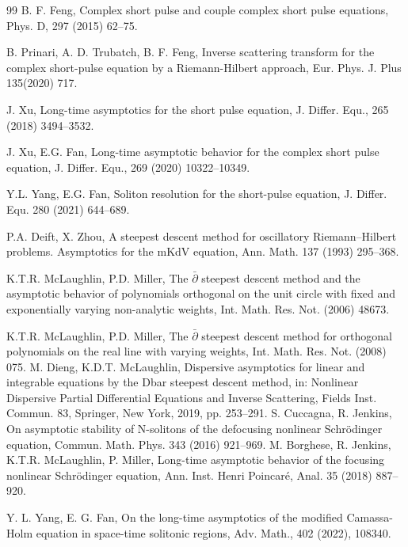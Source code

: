\documentclass[11pt]{article}
\numberwithin{equation}{section}
\begin{document}
\begin{thebibliography}{99}
  B. F. Feng,  Complex short pulse and couple complex short pulse equations, Phys. D, 297 (2015) 62--75.

  B. Prinari,  A. D. Trubatch, B. F.  Feng, Inverse scattering transform for the complex short-pulse equation by a Riemann-Hilbert approach, Eur. Phys. J. Plus 135(2020)  717.


 J. Xu,
Long-time asymptotics for the short pulse equation, J. Differ. Equ.,  265 (2018) 3494--3532.

 J. Xu,  E.G. Fan, Long-time asymptotic behavior for the complex short
pulse equation, J. Differ. Equ.,  269 (2020) 10322--10349.


 Y.L. Yang, E.G. Fan, Soliton resolution for the short-pulse equation, J. Differ. Equ. 280 (2021) 644--689.



 P.A. Deift, X. Zhou, A steepest descent method for oscillatory Riemann--Hilbert problems. Asymptotics for the mKdV equation, Ann. Math. 137 (1993) 295--368.


 K.T.R. McLaughlin, P.D. Miller, The $\bar{\partial}$ steepest descent method and the asymptotic behavior of polynomials orthogonal on the unit circle with fixed and exponentially varying non-analytic weights, Int. Math. Res. Not. (2006) 48673.

 K.T.R. McLaughlin, P.D. Miller, The $\bar{\partial}$ steepest descent method for orthogonal polynomials on the real line with varying weights, Int. Math. Res. Not. (2008) 075.
 M. Dieng, K.D.T. McLaughlin, Dispersive asymptotics for linear and integrable equations by the Dbar steepest descent method, in: Nonlinear Dispersive Partial Differential Equations and Inverse Scattering, Fields Inst. Commun. 83, Springer, New York, 2019, pp. 253--291.
 S. Cuccagna, R. Jenkins, On asymptotic stability of N-solitons of the defocusing nonlinear Schr\"odinger equation, Commun. Math. Phys. 343 (2016) 921--969.
 M. Borghese, R. Jenkins, K.T.R. McLaughlin, P. Miller, Long-time asymptotic behavior of the focusing nonlinear Schr\"odinger equation, Ann. Inst. Henri Poincar\'e, Anal. 35 (2018) 887--920.

 Y. L. Yang, E. G. Fan, \newblock   On the long-time asymptotics of the modified Camassa-Holm equation in space-time solitonic regions,  Adv. Math., 402 (2022), 108340.


\end{thebibliography}
\end{document}
